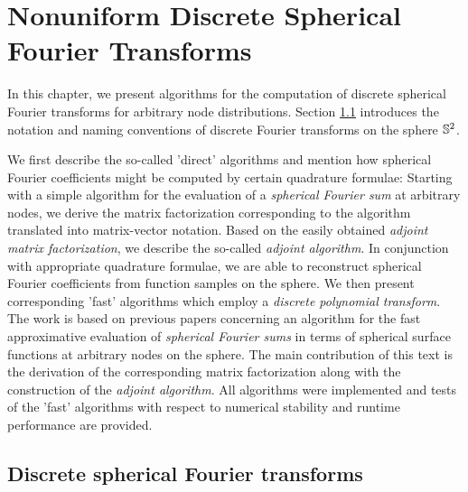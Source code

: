 \chapter{Nonuniform Discrete Spherical Fourier Transforms}
\label{DSFT}

In this chapter, we present algorithms for the computation of discrete
spherical Fourier transforms for arbitrary node distributions. 
Section \ref{NFSFT:dsfts} introduces the notation and naming conventions
of discrete Fourier transforms on the sphere $\mathbb{S}^2$. 


We first describe the so-called 'direct' algorithms 
and mention how spherical Fourier coefficients might be computed 
by certain quadrature formulae: Starting with a simple algorithm 
for the evaluation of a \emph{spherical Fourier sum} at arbitrary 
nodes, we derive the matrix factorization corresponding to the 
algorithm translated into matrix-vector notation. Based on the 
easily obtained \emph{adjoint matrix factorization}, we 
describe the so-called \emph{adjoint algorithm}. In conjunction
with appropriate quadrature formulae, we are able to reconstruct
spherical Fourier coefficients from function samples on the sphere.
We then present corresponding 'fast' algorithms which employ a
\emph{discrete polynomial transform}. The work is based on 
previous papers concerning an algorithm for 
the fast approximative evaluation of \emph{spherical Fourier sums} 
in terms of spherical surface functions at arbitrary nodes on the 
sphere. The main contribution of this text is the derivation of the corresponding
matrix factorization along with the construction of the 
\emph{adjoint algorithm}. All algorithms were implemented and tests 
of the 'fast' algorithms with respect to numerical stability and 
runtime performance are provided.

\section{Discrete spherical Fourier transforms}
\label{NFSFT:dsfts}

